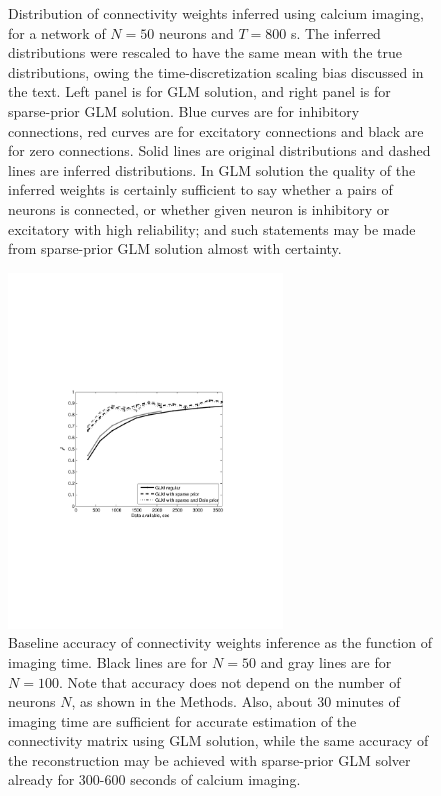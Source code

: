 \documentclass[amsmath,amssymb]{revtex4}
\begin{document}
\begin{figure}
\begin{minipage}[c]{0.45\hsize}
\end{minipage}
\caption{Distribution of connectivity weights inferred using calcium imaging, for
a network of $N=50$ neurons and $T=800$ s. The inferred distributions were rescaled
to have the same mean with the true distributions, owing the time-discretization scaling bias
discussed in the text.
Left panel is for GLM solution,
and right panel is for sparse-prior GLM solution.
Blue curves are for inhibitory connections, red curves are for excitatory
connections and black are for zero connections. Solid lines are original
distributions and dashed lines are inferred distributions. In GLM solution the quality of the inferred weights is certainly sufficient to say whether a pairs of neurons is connected, or whether given neuron is inhibitory or excitatory with high reliability; and such statements may be made from sparse-prior GLM solution almost with certainty.}
\label{fig:distr}
\end{figure}
\begin{figure}
\includegraphics[width=275px]{Figure4_perf_vs_T}
\caption{Baseline accuracy of connectivity weights inference as the function of imaging time. Black lines are for $N=50$ and gray lines are for $N=100$. Note that accuracy does not depend on the number of neurons $N$, as shown in the Methods. Also, about 30 minutes of imaging time are sufficient for accurate estimation of the connectivity matrix using GLM solution, while the same accuracy of the reconstruction may be achieved with sparse-prior GLM solver already for 300-600 seconds of calcium imaging.}
\label{fig:data-time}
\end{figure}
\end{document}
